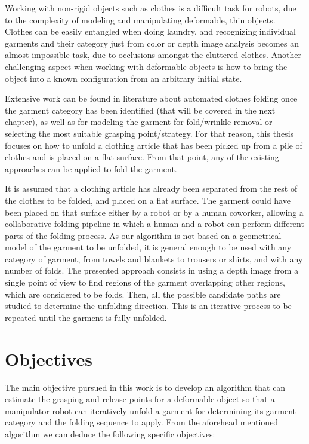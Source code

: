 Working with non-rigid objects such as clothes is a difficult task for robots, due to the complexity of modeling and manipulating deformable, thin objects. Clothes can be easily entangled when doing laundry, and recognizing individual garments and their category just from color or depth image analysis becomes an almost impossible task, due to occlusions amongst the cluttered clothes. Another challenging aspect when working with deformable objects is how to bring the object into a known configuration from an arbitrary initial state.


Extensive work can be found in literature about automated clothes folding once the garment category has been identified (that will be covered in the next chapter), as well as for modeling the garment for fold/wrinkle removal or selecting the most suitable grasping point/strategy. For that reason, this thesis focuses on how to unfold a clothing article that has been picked up from a pile of clothes and is placed on a flat surface. From that point, any of the existing approaches can be applied to fold the garment.

It is assumed that a clothing article has already been separated from the rest of the clothes to be folded, and placed on a flat surface. The garment could have been placed on that surface either by a robot or by a human coworker, allowing a collaborative folding pipeline in which a human and a robot can perform different parts of the folding process.
As our algorithm is not based on a geometrical model of the garment to be unfolded, it is general enough to be used with any category of garment, from towels and blankets to trousers or shirts, and with any number of folds. 
%
The presented approach consists in using a depth image from a single point of view to find regions of the garment overlapping other regions, which are considered to be folds. Then, all the possible candidate paths are studied to determine the unfolding direction. This is an iterative process to be repeated until the garment is fully unfolded.

\section{Objectives}
\label{intro_objectives}
The main objective pursued in this work is to develop an algorithm that can estimate the grasping and release points for a deformable object so that a manipulator robot can iteratively unfold a garment for determining its garment category and the folding sequence to apply. From the aforehead mentioned algorithm we can deduce the following specific objectives:

